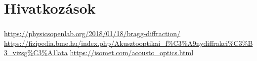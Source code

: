 \documentclass[aspectratio=169]{beamer}
\begin{document}
\section{Hivatkozások}
\begin{frame}
\frametitle{\secname}
\begin{thebibliography}{99}
\footnotesize
{}
 \url{https://physicsopenlab.org/2018/01/18/bragg-diffraction/}
 \url{https://fizipedia.bme.hu/index.php/Akusztooptikai_f\%C3\%A9nydiffrakci\%C3\%B3_vizsg\%C3\%A1lata}
 \url{https://isomet.com/acousto_optics.html}
\end{thebibliography}
\end{frame}
\end{document}
